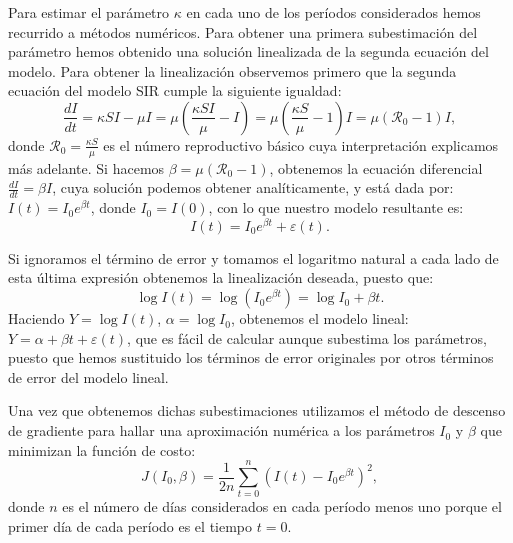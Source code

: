 \documentclass[12pt]{article}
\begin{document}
	Para estimar el parámetro $ \kappa $ en cada uno de los períodos considerados hemos recurrido a métodos numéricos. Para obtener una primera subestimación del parámetro hemos obtenido una solución linealizada de la segunda ecuación del modelo. Para obtener la linealización observemos primero que la segunda ecuación del modelo SIR cumple la siguiente igualdad:
	\[ \frac{dI}{dt} = \kappa SI - \mu I = \mu\left(\frac{\kappa SI}{\mu} - I\right) = \mu\left(\frac{\kappa S}{\mu} - 1\right)I = \mu(\mathcal{R}_0 - 1)I, \tag{1} \]
	donde $ \mathcal{R}_0 = \frac{\kappa S}{\mu} $ es el número reproductivo básico cuya interpretación explicamos más adelante. Si hacemos $ \beta = \mu\left(\mathcal{R}_0 - 1\right) $, obtenemos la ecuación diferencial $ \frac{dI}{dt} = \beta I $, cuya solución podemos obtener analíticamente, y está dada por: $ I(t) = I_0e^{\beta t} $, donde $ I_0 = I(0) $, con lo que nuestro modelo resultante es:
	\[ I(t) = I_0e^{\beta t} + \varepsilon(t) . \] 
	
	Si ignoramos el término de error y tomamos el logaritmo natural a cada lado de esta última expresión obtenemos la linealización deseada, puesto que:
	\begin{equation*}
	\log I(t) = \log(I_0 e^{\beta t}) = \log I_0 + \beta t.
	\end{equation*}
	Haciendo $ Y = \log I(t) $, $ \alpha = \log I_0 $, obtenemos el modelo lineal: $ Y = \alpha + \beta t + \varepsilon(t) $, que es fácil de calcular aunque subestima los parámetros, puesto que hemos sustituido los términos de error originales por otros términos de error del modelo lineal.
	
	Una vez que obtenemos dichas subestimaciones utilizamos el método de descenso de gradiente para hallar una aproximación numérica a los parámetros $ I_0 $ y $ \beta $ que minimizan la función de costo:
	\[ J(I_0, \beta) = \frac{1}{2n}\sum_{t=0}^{n}\left( I(t) - I_0e^{\beta t} \right)^2, \]
	donde $ n $ es el número de días considerados en cada período menos uno porque el primer día de cada período es el tiempo $ t=0 $.
	
\end{document}
